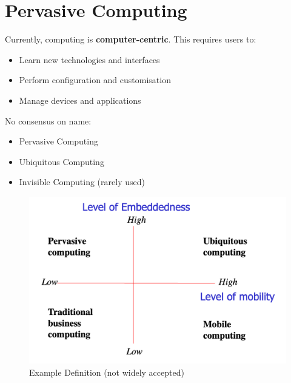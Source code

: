 \section{Pervasive Computing}
Currently, computing is \textbf{computer-centric}. This requires users to:
\begin{itemize}
	\item Learn new technologies and interfaces
	\item Perform configuration and customisation
	\item Manage devices and applications	
\end{itemize}
No consensus on name:
\begin{itemize}
	\item Pervasive Computing
	\item Ubiquitous Computing
	\item Invisible Computing (rarely used)	
\end{itemize}

\begin{figure}[h]
	\centering
	\includegraphics[width=0.8\linewidth]{definitions}
	\caption{Example Definition (not widely accepted)}
\end{figure}

